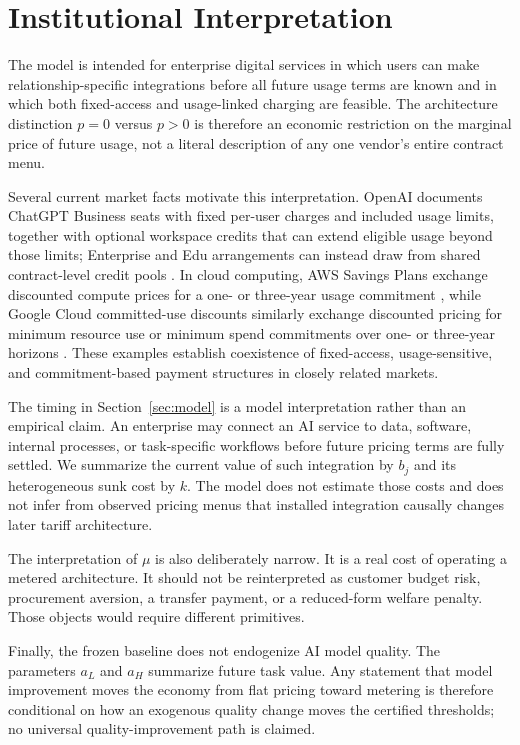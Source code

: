 \section{Institutional Interpretation}\label{sec:institutional}

The model is intended for enterprise digital services in which users can make relationship-specific integrations before all future usage terms are known and in which both fixed-access and usage-linked charging are feasible. The architecture distinction $p=0$ versus $p>0$ is therefore an economic restriction on the marginal price of future usage, not a literal description of any one vendor's entire contract menu.

Several current market facts motivate this interpretation. OpenAI documents ChatGPT Business seats with fixed per-user charges and included usage limits, together with optional workspace credits that can extend eligible usage beyond those limits; Enterprise and Edu arrangements can instead draw from shared contract-level credit pools \citep{openaibusinesspricing2026,openaiflexible2026}. In cloud computing, AWS Savings Plans exchange discounted compute prices for a one- or three-year usage commitment \citep{awssavingsplans2026}, while Google Cloud committed-use discounts similarly exchange discounted pricing for minimum resource use or minimum spend commitments over one- or three-year horizons \citep{googlecud2026}. These examples establish coexistence of fixed-access, usage-sensitive, and commitment-based payment structures in closely related markets.

The timing in Section~\ref{sec:model} is a model interpretation rather than an empirical claim. An enterprise may connect an AI service to data, software, internal processes, or task-specific workflows before future pricing terms are fully settled. We summarize the current value of such integration by $b_j$ and its heterogeneous sunk cost by $k$. The model does not estimate those costs and does not infer from observed pricing menus that installed integration causally changes later tariff architecture.

The interpretation of $\mu$ is also deliberately narrow. It is a real cost of operating a metered architecture. It should not be reinterpreted as customer budget risk, procurement aversion, a transfer payment, or a reduced-form welfare penalty. Those objects would require different primitives.

Finally, the frozen baseline does not endogenize AI model quality. The parameters $a_L$ and $a_H$ summarize future task value. Any statement that model improvement moves the economy from flat pricing toward metering is therefore conditional on how an exogenous quality change moves the certified thresholds; no universal quality-improvement path is claimed.
